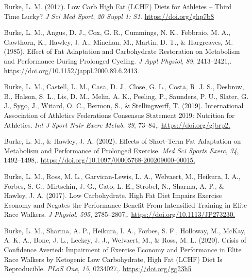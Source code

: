 \documentclass[]{cik}%
\newlength{\cslhangindent}
\newlength{\cslentryspacingunit} %
\newenvironment{CSLReferences}[2] %
 {%
  \setlength{\parindent}{0pt}
  \ifodd #1
  \let\oldpar\par
  \def\par{\hangindent=\cslhangindent\oldpar}
  \fi
  \setlength{\parskip}{#2\cslentryspacingunit}
 }%
 {}
\begin{document}
\parindent0pt 
\setlength{\parskip}{1em}

\hypertarget{refs}{}
\begin{CSLReferences}{1}{0}
\leavevmode{}%
Burke, L. M. (2017). Low Carb High Fat (LCHF) Diets for Athletes --
Third Time Lucky? \emph{J Sci Med Sport}, \emph{20 Suppl 1: S1}.
\url{https://doi.org/ghp7b8}

\leavevmode{}%
Burke, L. M., Angus, D. J., Cox, G. R., Cummings, N. K., Febbraio, M.
A., Gawthorn, K., Hawley, J. A., Minehan, M., Martin, D. T., \&
Hargreaves, M. (1985). Effect of Fat Adaptation and Carbohydrate
Restoration on Metabolism and Performance During Prolonged Cycling.
\emph{J Appl Physiol}, \emph{89}, 2413--2421,.
\url{https://doi.org/10.1152/jappl.2000.89.6.2413.}

\leavevmode{}%
Burke, L. M., Castell, L. M., Casa, D. J., Close, G. L., Costa, R. J.
S., Desbrow, B., Halson, S. L., Lis, D. M., Melin, A. K., Peeling, P.,
Saunders, P. U., Slater, G. J., Sygo, J., Witard, O. C., Bermon, S., \&
Stellingwerff, T. (2019). International Association of Athletics
Federations Consensus Statement 2019: Nutrition for Athletics. \emph{Int
J Sport Nutr Exerc Metab}, \emph{29}, 73--84,.
\url{https://doi.org/gjbrp2.}

\leavevmode{}%
Burke, L. M., \& Hawley, J. A. (2002). Effects of Short-Term Fat
Adaptation on Metabolism and Performance of Prolonged Exercise.
\emph{Med Sci Sports Exerc}, \emph{34}, 1492--1498,.
\url{https://doi.org/10.1097/00005768-200209000-00015.}

\leavevmode{}%
Burke, L. M., Ross, M. L., Garvican‐Lewis, L. A., Welvaert, M., Heikura,
I. A., Forbes, S. G., Mirtschin, J. G., Cato, L. E., Strobel, N.,
Sharma, A. P., \& Hawley, J. A. (2017). Low Carbohydrate, High Fat Diet
Impairs Exercise Economy and Negates the Performance Benefit From
Intensified Training in Elite Race Walkers. \emph{J Physiol},
\emph{595}, 2785--2807,. \url{https://doi.org/10.1113/JP273230.}

\leavevmode{}%
Burke, L. M., Sharma, A. P., Heikura, I. A., Forbes, S. F., Holloway,
M., McKay, A. K. A., Bone, J. L., Leckey, J. J., Welvaert, M., \& Ross,
M. L. (2020). Crisis of Confidence Averted: Impairment of Exercise
Economy and Performance in Elite Race Walkers by Ketogenic Low
Carbohydrate, High Fat (LCHF) Diet Is Reproducible. \emph{PLoS One},
\emph{15}, 0234027,. \url{https://doi.org/gg23h5}


\end{CSLReferences}
\end{document}
